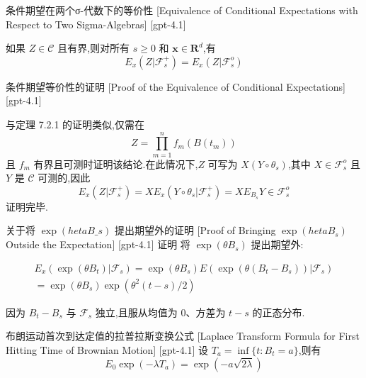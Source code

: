 \documentclass[UTF8]{ctexart}
\begin{document}
    
    
    \begin{thm}
        {条件期望在两个σ-代数下的等价性}
        [Equivalence of Conditional Expectations with Respect to Two Sigma-Algebras]
        [gpt-4.1]
        
如果 $Z \in \mathcal{C}$ 且有界,则对所有 $s \geq 0$ 和 $\boldsymbol{x} \in \mathbf{R}^{d}$,有
\[
E_{x} ( Z | \mathcal{F}_{s}^{+} ) = E_{x} ( Z | \mathcal{F}_{s}^{o} )
\]

    \end{thm}
    
    
    
    \begin{prf}
        {条件期望等价性的证明}
        [Proof of the Equivalence of Conditional Expectations]
        [gpt-4.1]
        
与定理 7.2.1 的证明类似,仅需在
\[
Z = \prod_{m=1}^{n} f_{m} ( B ( t_{m} ) )
\]
且 $f_{m}$ 有界且可测时证明该结论.在此情况下,$Z$ 可写为 $X ( Y \circ \theta_{s} )$,其中 $X \in \mathcal{F}_{s}^{o}$ 且 $Y$ 是 $\mathcal{C}$ 可测的,因此
\[
E_{x} ( Z | \mathcal{F}_{s}^{+} ) = X E_{x} ( Y \circ \theta_{s} | \mathcal{F}_{s}^{+} ) = X E_{B_{s}} Y \in \mathcal{F}_{s}^{o}
\]
证明完毕.

    \end{prf}
    
    
    
    \begin{prf}
        {关于将 $\exp(	heta B\_{s})$ 提出期望外的证明}
        [Proof of Bringing $\exp(	heta B_{s})$ Outside the Expectation]
        [gpt-4.1]
        证明 将 $\exp(\theta B_{s})$ 提出期望外:

\[
\begin{array}{c}
E_{x}(\exp(\theta B_{t}) | \mathcal{F}_{s}) = \exp(\theta B_{s}) E(\exp(\theta (B_{t} - B_{s})) | \mathcal{F}_{s}) \\
= \exp(\theta B_{s}) \exp(\theta^{2} (t - s)/2)
\end{array}
\]

因为 $B_{t} - B_{s}$ 与 $\mathcal{F}_{s}$ 独立,且服从均值为 $0$、方差为 $t - s$ 的正态分布.

    \end{prf}
    
    
    
    \begin{thm}
        {布朗运动首次到达定值的拉普拉斯变换公式}
        [Laplace Transform Formula for First Hitting Time of Brownian Motion]
        [gpt-4.1]
        设 $T_{a} = \operatorname{inf}\{ t : B_{t} = a \}$,则有
\[
E_{0} \exp(-\lambda T_{a}) = \exp(-a \sqrt{2 \lambda})
\]

    \end{thm}
    
\end{document}
